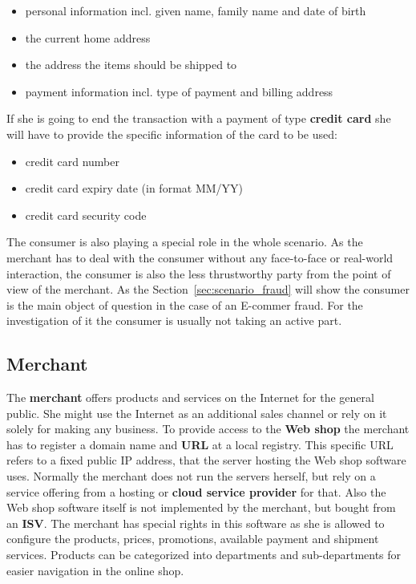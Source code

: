\begin{itemize}
		\item personal information incl. given name, family name and date of birth
		\item the current home address
		\item the address the items should be shipped to
		\item payment information incl. type of payment and billing address
\end{itemize}

If she is going to end the transaction with a payment of type \textbf{credit card} she will have to provide the specific information of the card to be used:\@

\begin{itemize}
		\item credit card number
		\item credit card expiry date (in format MM/YY)
		\item credit card security code
\end{itemize}

The consumer is also playing a special role in the whole scenario. As the merchant has to deal with the consumer without any face-to-face or real-world interaction, the consumer is also the less thrustworthy party from the point of view of the merchant. As the Section~\ref{sec:scenario_fraud} will show the consumer is the main object of question in the case of an E-commer fraud. For the investigation of it the consumer is usually not taking an active part.


\subsection{Merchant}
\label{subsec:stakeholder_merchant}

The \textbf{merchant} offers products and services on the Internet for the general public. She might use the Internet as an additional sales channel or rely on it solely for making any business. To provide access to the \textbf{Web shop} the merchant has to register a domain name and \textbf{\gls{URL}} at a local registry. This specific \gls{URL} refers to a fixed public \gls{IP} address, that the server hosting the Web shop software uses. Normally the merchant does not run the servers herself, but rely on a service offering from a hosting or \textbf{cloud service provider} for that. Also the Web shop software itself is not implemented by the merchant, but bought from an \textbf{\gls{ISV}}. The merchant has special rights in this software as she is allowed to configure the products, prices, promotions, available payment and shipment services. Products can be categorized into departments and sub-departments for easier navigation in the online shop. \\


